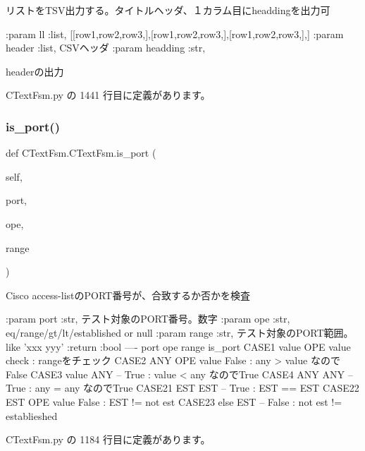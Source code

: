 \begin{DoxyVerb}リストをTSV出力する。タイトルヘッダ、１カラム目にheaddingを出力可

:param ll       :list, [[row1,row2,row3,],[row1,row2,row3,],[row1,row2,row3,],]
:param header   :list, CSVヘッダ
:param headding :str,
\end{DoxyVerb}
\begin{DoxyVerb}headerの出力
\end{DoxyVerb}
 

 C\+Text\+Fsm.\+py の 1441 行目に定義があります。

\mbox{\label{classCTextFsm_1_1CTextFsm_afba04726b4663e2a7d3ec4d4804af277}} 
\subsubsection{\texorpdfstring{is\_port()}{is\_port()}}
{\footnotesize\ttfamily def C\+Text\+Fsm.\+C\+Text\+Fsm.\+is\+\_\+port (\begin{DoxyParamCaption}\item[{}]{self,  }\item[{}]{port,  }\item[{}]{ope,  }\item[{}]{range }\end{DoxyParamCaption})}

\begin{DoxyVerb}Cisco access-listのPORT番号が、合致するか否かを検査

:param  port  :str, テスト対象のPORT番号。数字
:param  ope   :str, eq/range/gt/lt/established or null
:param  range :str, テスト対象のPORT範囲。like 'xxx yyy'
:return :bool
----
port    ope     range       is_port
CASE1   value   OPE     value       check : rangeをチェック
CASE2   ANY     OPE     value       False : any > value なのでFalse
CASE3   value   ANY     --          True  : value < any なのでTrue
CASE4   ANY     ANY     --          True  : any = any   なのでTrue
CASE21  EST     EST     --          True  : EST == EST
CASE22  EST     OPE    value        False : EST != not est
CASE23  else    EST     --          False : not est != establieshed
\end{DoxyVerb}
 

 C\+Text\+Fsm.\+py の 1184 行目に定義があります。

\mbox{\label{classCTextFsm_1_1CTextFsm_a2d26ded29b0a795000470f2f9d9186cb}} 

